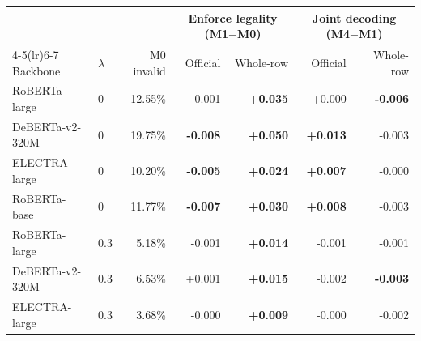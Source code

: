 \begin{tabular}{llrrrrr}
\toprule
 & & & \multicolumn{2}{c}{Enforce legality (M1$-$M0)} & \multicolumn{2}{c}{Joint decoding (M4$-$M1)} \\
\cmidrule(lr){4-5}\cmidrule(lr){6-7}
Backbone & $\lambda$ & M0 invalid & Official & Whole-row & Official & Whole-row \\
\midrule
RoBERTa-large & 0 & 12.55\% & -0.001 & \textbf{+0.035} & +0.000 & \textbf{-0.006} \\
DeBERTa-v2-320M & 0 & 19.75\% & \textbf{-0.008} & \textbf{+0.050} & \textbf{+0.013} & -0.003 \\
ELECTRA-large & 0 & 10.20\% & \textbf{-0.005} & \textbf{+0.024} & \textbf{+0.007} & -0.000 \\
RoBERTa-base & 0 & 11.77\% & \textbf{-0.007} & \textbf{+0.030} & \textbf{+0.008} & -0.003 \\
\midrule
RoBERTa-large & 0.3 & 5.18\% & -0.001 & \textbf{+0.014} & -0.001 & -0.001 \\
DeBERTa-v2-320M & 0.3 & 6.53\% & +0.001 & \textbf{+0.015} & -0.002 & \textbf{-0.003} \\
ELECTRA-large & 0.3 & 3.68\% & -0.000 & \textbf{+0.009} & -0.000 & -0.002 \\
\bottomrule
\end{tabular}
